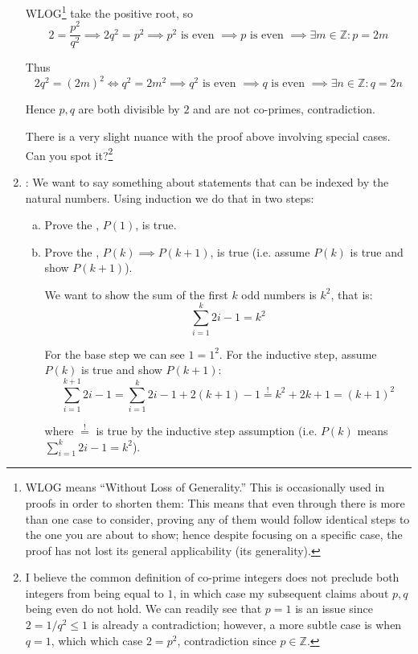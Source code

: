 \documentclass{article}
\begin{document}
\begin{enumerate}
\begin{example}
      WLOG\footnote{WLOG means ``Without Loss of Generality.'' This is occasionally used in proofs in order to shorten them: This means that even through there is more than one case to consider, proving any of them would follow identical steps to the one you are about to show; hence despite focusing on a specific case, the proof has not lost its general applicability (its generality).} take the positive root, so
      \[
        2 = \dfrac{p^2}{q^2}
        \implies
        2q^2 = p^2
        \implies
        p^2 \text{ is even }
        \implies
        p \text{ is even }
        \implies
        \exists m \in \mathbb{Z}: p = 2m
      \]

      Thus
      \[
        2q^2 = (2m)^2
        \iff
        q^2 = 2m^2
        \implies
        q^2 \text{ is even }
        \implies
        q \text{ is even }
        \implies
        \exists n \in \mathbb{Z}: q = 2n
      \]

      Hence $p, q$ are both divisible by $2$ and are not co-primes, contradiction.
    \end{example}

    There is a very slight nuance with the proof above involving special cases. Can you spot it?\footnote{I believe the common definition of co-prime integers does not preclude both integers from being equal to $1$, in which case my subsequent claims about $p, q$ being even do not hold. We can readily see that $p = 1$ is an issue since $2 = 1/q^2 \le 1$ is already a contradiction; however, a more subtle case is when $q = 1$, which which case $2 = p^2$, contradiction since $p \in \mathbb{Z}$.}

  \item {}: We want to say something about statements that can be indexed by the natural numbers. Using induction we do that in two steps:
    \begin{enumerate}[a)]
      \item Prove the , $P(1)$, is true.

      \item Prove the , $P(k) \implies P(k + 1)$, is true (i.e. assume $P(k)$ is true and show $P(k + 1)$).
        \begin{example}
          We want to show the sum of the first $k$ odd numbers is $k^2$, that is:
          \[
            \sum^{k}_{i = 1} 2i - 1 = k^2
          \]

          For the base step we can see $1 = 1^2$. For the inductive step, assume $P(k)$ is true and show $P(k + 1)$:
          \[
            \sum^{k + 1}_{i = 1} 2i - 1
            =
            \sum^{k}_{i = 1} 2i - 1
            +
            2(k + 1) - 1
            \stackrel{!}{=}
            k^2
            +
            2k
            +
            1
            =
            (k +  1)^2
          \]

          where $\stackrel{!}{=}$ is true by the inductive step assumption (i.e. $P(k)$ means $\sum^{k}_{i = 1} 2i - 1 = k^2$).
        \end{example}
    \end{enumerate}
\end{enumerate}
\end{document}

